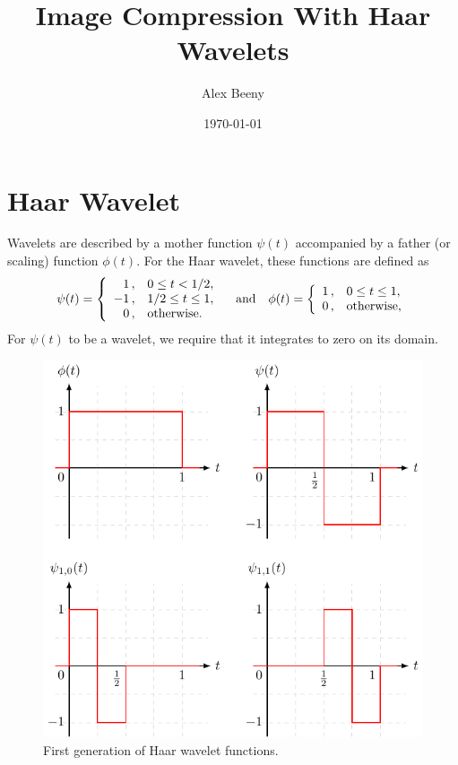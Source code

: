 \documentclass{article}
\title{Image Compression With Haar Wavelets}
\author{Alex Beeny}
\date{\today}
\theoremstyle{definition}
\begin{document}
  \maketitle

  \section{Haar Wavelet}
  
  Wavelets are described by a mother function \(\psi(t)\) accompanied by a father (or scaling) function \(\phi(t)\). For the Haar wavelet, these functions are defined as
  \begin{equation}
    \psi(t) =
    \left\{
      \begin{array}{r@{\,,\quad}l}
         1 & 0 \leq t < 1/2,\\
        -1 & 1/2 \leq t \leq 1,\\
         0 & \text{otherwise}.
      \end{array}
    \right.
    \qand
    \phi(t) =
    \left\{
      \begin{array}{r@{\,,\quad}l}
        1 & 0 \leq t \leq 1,\\
        0 & \text{otherwise},
      \end{array}
    \right.
  \end{equation}
  For \(\psi(t)\) to be a wavelet, we require that it integrates to zero on its domain.

  \begin{figure}[ht]
    \centering
    \includegraphics{figs/fig-parents.pdf}
    \caption{First generation of Haar wavelet functions.}
    \label{fig:haar-fcn}
  \end{figure}
\end{document}
